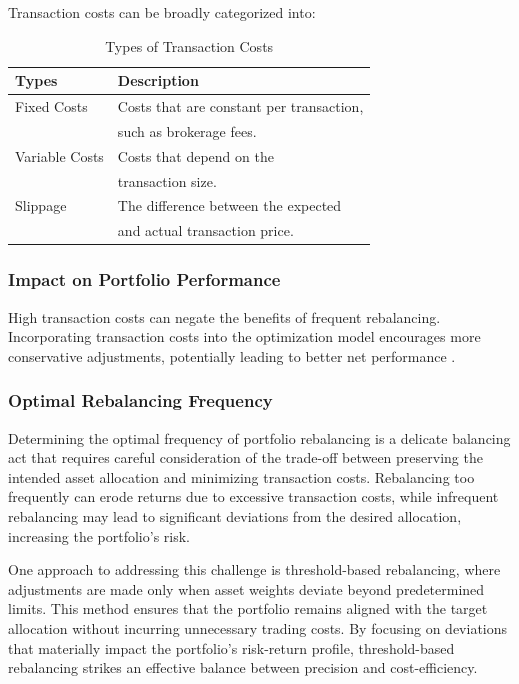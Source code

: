 Transaction costs can be broadly categorized into:

\begin{table}[h!]
\centering
\begin{tabular}{|l|p{8cm}|}
\hline
\textbf{Types} & \textbf{Description} \\ \hline
Fixed Costs & Costs that are constant per transaction, \\
            & such as brokerage fees. \\ \hline
Variable Costs & Costs that depend on the \\
               & transaction size. \\ \hline
Slippage & The difference between the expected \\
         & and actual transaction price. \\ \hline
\end{tabular}
\caption{Types of Transaction Costs}
\label{tab:transaction_costs}
\end{table}


  




\subsubsection{Impact on Portfolio Performance}

High transaction costs can negate the benefits of frequent rebalancing. Incorporating transaction costs into the optimization model encourages more conservative adjustments, potentially leading to better net performance \cite{garleanu2009dynamic}.

\subsubsection{Optimal Rebalancing Frequency}

Determining the optimal frequency of portfolio rebalancing is a delicate balancing act that requires careful consideration of the trade-off between preserving the intended asset allocation and minimizing transaction costs. Rebalancing too frequently can erode returns due to excessive transaction costs, while infrequent rebalancing may lead to significant deviations from the desired allocation, increasing the portfolio’s risk.

One approach to addressing this challenge is threshold-based rebalancing, where adjustments are made only when asset weights deviate beyond predetermined limits. This method ensures that the portfolio remains aligned with the target allocation without incurring unnecessary trading costs. By focusing on deviations that materially impact the portfolio's risk-return profile, threshold-based rebalancing strikes an effective balance between precision and cost-efficiency.

